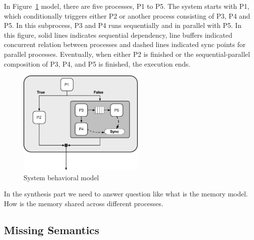 In Figure~\ref{fig:task_graph} model, there are five processes, P1 to P5.
The system starts with P1, which conditionally triggers either P2 or another process consisting of P3, P4 and P5.
In this subprocess, P3 and P4 runs sequentially and in parallel with P5. In this figure, solid lines indicates sequential dependency, line buffers indicated concurrent relation between processes and dashed lines indicated sync points for parallel processes.
Eventually, when either P2 is finished or the sequential-parallel composition of P3, P4, and P5 is finished, the execution ends.

\begin{figure}[h]
    \centering
    \includegraphics[width=0.55\textwidth]{figures/Introduction/Task_Graph.pdf}
    \caption{System behavioral model}
    \label{fig:task_graph}
\end{figure}


In the synthesis part we need to answer question like what is the memory model. How is the memory shared across different processes.



\subsection{Missing Semantics}
\label{sec:missing_semantics}

